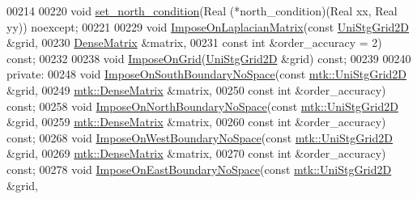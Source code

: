 \begin{DoxyCode}
00214 
00220   \textcolor{keywordtype}{void} \hyperlink{classmtk_1_1BCDescriptor2D_a690f6881a88b202c074d9f90f2a7ddb0}{set\_north\_condition}(Real (*north\_condition)(Real xx, Real yy)) noexcept;
00221 
00229   \textcolor{keywordtype}{void} \hyperlink{classmtk_1_1BCDescriptor2D_a35592617dda3b965b680b2a1355122f4}{ImposeOnLaplacianMatrix}(\textcolor{keyword}{const} \hyperlink{classmtk_1_1UniStgGrid2D}{UniStgGrid2D} &grid,
00230                                \hyperlink{classmtk_1_1DenseMatrix}{DenseMatrix} &matrix,
00231                                \textcolor{keyword}{const} \textcolor{keywordtype}{int} &order\_accuracy = 2) \textcolor{keyword}{const};
00232 
00238   \textcolor{keywordtype}{void} \hyperlink{classmtk_1_1BCDescriptor2D_a5f0ff1fda1b5266dcd77ba2301c8ba2c}{ImposeOnGrid}(\hyperlink{classmtk_1_1UniStgGrid2D}{UniStgGrid2D} &grid) \textcolor{keyword}{const};
00239 
00240 \textcolor{keyword}{private}:
00248   \textcolor{keywordtype}{void} \hyperlink{classmtk_1_1BCDescriptor2D_a0188a64f242ae6015385a4597934fcda}{ImposeOnSouthBoundaryNoSpace}(\textcolor{keyword}{const} 
      \hyperlink{classmtk_1_1UniStgGrid2D}{mtk::UniStgGrid2D} &grid,
00249                                     \hyperlink{classmtk_1_1DenseMatrix}{mtk::DenseMatrix} &matrix,
00250                                     \textcolor{keyword}{const} \textcolor{keywordtype}{int} &order\_accuracy) \textcolor{keyword}{const};
00258   \textcolor{keywordtype}{void} \hyperlink{classmtk_1_1BCDescriptor2D_a5e7d4b9deba6c07170e983eb1c0e9776}{ImposeOnNorthBoundaryNoSpace}(\textcolor{keyword}{const} 
      \hyperlink{classmtk_1_1UniStgGrid2D}{mtk::UniStgGrid2D} &grid,
00259                                     \hyperlink{classmtk_1_1DenseMatrix}{mtk::DenseMatrix} &matrix,
00260                                     \textcolor{keyword}{const} \textcolor{keywordtype}{int} &order\_accuracy) \textcolor{keyword}{const};
00268   \textcolor{keywordtype}{void} \hyperlink{classmtk_1_1BCDescriptor2D_a0b153abdcb78c54197858148c9632517}{ImposeOnWestBoundaryNoSpace}(\textcolor{keyword}{const} 
      \hyperlink{classmtk_1_1UniStgGrid2D}{mtk::UniStgGrid2D} &grid,
00269                                    \hyperlink{classmtk_1_1DenseMatrix}{mtk::DenseMatrix} &matrix,
00270                                    \textcolor{keyword}{const} \textcolor{keywordtype}{int} &order\_accuracy) \textcolor{keyword}{const};
00278   \textcolor{keywordtype}{void} \hyperlink{classmtk_1_1BCDescriptor2D_a65f58f43f3fdc793cce7293780b70b80}{ImposeOnEastBoundaryNoSpace}(\textcolor{keyword}{const} 
      \hyperlink{classmtk_1_1UniStgGrid2D}{mtk::UniStgGrid2D} &grid,

\end{DoxyCode}
